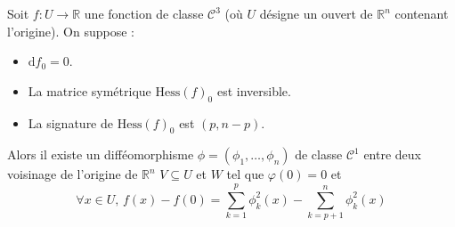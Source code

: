 	\begin{lemma}[Morse]
		\label{lemme-de-morse-2}
		Soit $f : U \rightarrow \mathbb{R}$ une fonction de classe $\mathcal{C}^3$ (où $U$ désigne un ouvert de $\mathbb{R}^n$ contenant l'origine). On suppose :
		\begin{itemize}
			\item $\mathrm{d} f_0 = 0$.
			\item La matrice symétrique $\mathrm{Hess} (f)_0$ est inversible.
			\item La signature de $\mathrm{Hess}(f)_0$ est $(p, n-p)$.
		\end{itemize}
		Alors il existe un difféomorphisme $\phi = (\phi_1, \dots, \phi_n)$ de classe $\mathcal{C}^1$ entre deux voisinage de l'origine de $\mathbb{R}^n$ $V \subseteq U$ et $W$ tel que $\varphi(0) = 0$ et
		\[ \forall x \in U, \, f(x) - f(0) = \sum_{k=1}^p \phi_k^2(x) - \sum_{k=p+1}^n \phi_k^2(x) \]
	\end{lemma}

